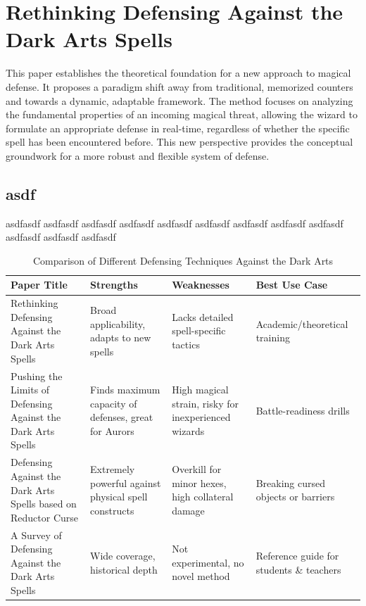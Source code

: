 \chapter{Rethinking Defensing Against the Dark Arts Spells}

This paper establishes the theoretical foundation for a new approach to magical defense. It proposes a paradigm shift away from traditional, memorized counters and towards a dynamic, adaptable framework. The method focuses on analyzing the fundamental properties of an incoming magical threat, allowing the wizard to formulate an appropriate defense in real-time, regardless of whether the specific spell has been encountered before. This new perspective provides the conceptual groundwork for a more robust and flexible system of defense.~\cite{rethink2025magic}

\section{asdf}
asdfasdf asdfasdf asdfasdf asdfasdf asdfasdf asdfasdf asdfasdf asdfasdf asdfasdf asdfasdf asdfasdf asdfasdf

\begin{table}[htbp]
\centering
\caption{Comparison of Different Defensing Techniques Against the Dark Arts}
\label{tab:defense_comparison2}
\begin{tabularx}{\textwidth}{p{2cm} X X X}
\hline
\textbf{Paper Title} & \textbf{Strengths} & \textbf{Weaknesses} & \textbf{Best Use Case} \\
\hline
Rethinking Defensing Against the Dark Arts Spells & Broad applicability, adapts to new spells & Lacks detailed spell-specific tactics & Academic/theoretical training \\
\hline
Pushing the Limits of Defensing Against the Dark Arts Spells & Finds maximum capacity of defenses, great for Aurors & High magical strain, risky for inexperienced wizards & Battle-readiness drills \\
\hline
Defensing Against the Dark Arts Spells based on Reductor Curse & Extremely powerful against physical spell constructs & Overkill for minor hexes, high collateral damage & Breaking cursed objects or barriers \\
\hline
A Survey of Defensing Against the Dark Arts Spells & Wide coverage, historical depth & Not experimental, no novel method & Reference guide for students \& teachers \\
\hline
\end{tabularx}
\end{table}



